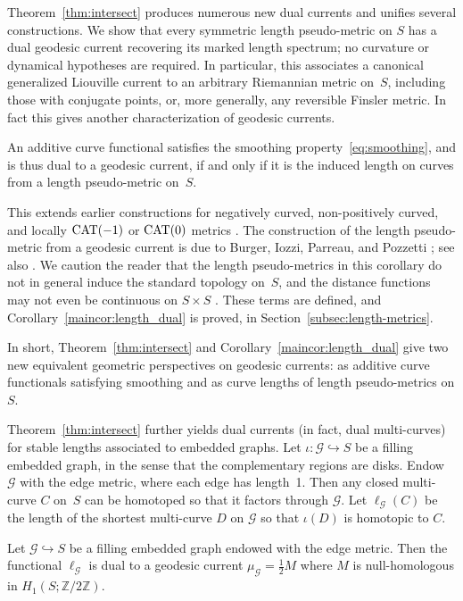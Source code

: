 Theorem~\ref{thm:intersect} produces numerous new dual currents and
unifies several constructions.  We show that every symmetric length
pseudo-metric on $S$ has a dual geodesic current recovering its marked
length spectrum; no curvature or dynamical hypotheses are required.
In particular, this associates a canonical generalized Liouville
current to an arbitrary Riemannian metric on~$S$, including those with
conjugate points, or, more generally, any reversible Finsler metric.
In fact this gives another characterization of geodesic
currents.
\begin{maincor}
  \label{maincor:length_dual}
  An additive curve functional satisfies the smoothing
  property~\eqref{eq:smoothing}, and is thus dual to a geodesic
  current, if and only if it is the induced length on curves from a
  length pseudo-metric on~$S$.
\end{maincor}

This extends earlier constructions for negatively curved,
non-positively curved, and locally $\operatorname{CAT}(-1)$ or $\operatorname{CAT}(0)$ metrics \cite{Otal90:SpectreMarqueNegative, CFF92:RigidityNonPosCurvedRiem, DLR10:DegenerationFlatMetrics, HP97:RigidityNegCurvedCone,BL17:RigidityFlat,Con18:MarkedNonpos, PS26:1ntranslation}.
The construction of the length pseudo-metric from a geodesic current
is due to Burger, Iozzi, Parreau, and Pozzetti
\cite[Section~4]{BIPP21:Systoles}; see also \cite{dRMG22:Duals}.
We caution the reader that the length pseudo-metrics in this corollary
do not in general
induce the standard topology on~$S$, and the distance functions may
not even be continuous on $S \times S$ \cite[Propositions 4.7,
4.12]{dRMG22:Duals}.
These terms are defined, and Corollary~\ref{maincor:length_dual} is
proved, in Section~\ref{subsec:length-metrics}.

In short, Theorem~\ref{thm:intersect} and Corollary~\ref{maincor:length_dual} give two new equivalent geometric perspectives on geodesic currents: as additive curve functionals satisfying smoothing and as curve lengths of length pseudo-metrics on $S$. 

Theorem~\ref{thm:intersect} further yields dual currents (in fact, dual multi-curves) for stable
lengths associated to embedded graphs. Let $\iota \colon \mathcal{G}
\hookrightarrow S$ be a filling embedded graph, in the sense that the complementary
regions are disks. 
Endow $\mathcal{G}$ with the edge metric, where each edge has
length~1. Then any closed multi-curve $C$ on~$S$ can be homotoped so
that it factors through $\mathcal{G}$.
 Let $\ell_{\mathcal{G}}(C)$ be the length of the shortest multi-curve
 $D$ on $\mathcal{G}$ so that $\iota(D)$ is homotopic to $C$.
\begin{maincor}
\label{maincor:embedded}
Let $\mathcal{G} \hookrightarrow S$ be a filling embedded graph
endowed with the edge metric. Then
the functional $\ell_{\mathcal{G}}$ is dual to a
geodesic current $\mu_{\mathcal{G}} = \frac12 M$ where $M$ is null-homologous in
$H_1(S; \mathbb{Z}/2\mathbb{Z})$.
\end{maincor}

